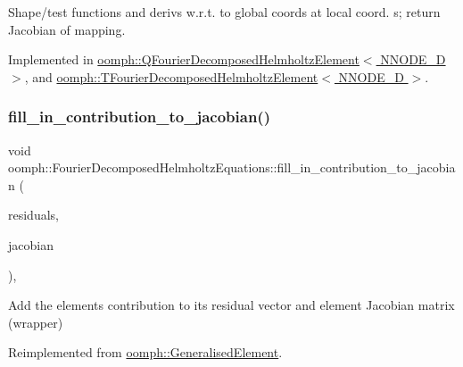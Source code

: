 Shape/test functions and derivs w.\+r.\+t. to global coords at local coord. s; return Jacobian of mapping. 



Implemented in \hyperlink{classoomph_1_1QFourierDecomposedHelmholtzElement_aa1d0a5bb5a90ffa76df0bb054ffb00db}{oomph\+::\+Q\+Fourier\+Decomposed\+Helmholtz\+Element$<$ N\+N\+O\+D\+E\+\_\+D $>$}, and \hyperlink{classoomph_1_1TFourierDecomposedHelmholtzElement_ae54e119a74f455c251ede7d536a7c0ab}{oomph\+::\+T\+Fourier\+Decomposed\+Helmholtz\+Element$<$ N\+N\+O\+D\+E\+\_\+D $>$}.

\mbox{\label{classoomph_1_1FourierDecomposedHelmholtzEquations_a75285db2b555ba4ad1f79ed9bb3bcf03}} 
\subsubsection{\texorpdfstring{fill\+\_\+in\+\_\+contribution\+\_\+to\+\_\+jacobian()}{fill\_in\_contribution\_to\_jacobian()}}
{\footnotesize\ttfamily void oomph\+::\+Fourier\+Decomposed\+Helmholtz\+Equations\+::fill\+\_\+in\+\_\+contribution\+\_\+to\+\_\+jacobian (\begin{DoxyParamCaption}\item[{\hyperlink{classoomph_1_1Vector}{Vector}$<$ double $>$ \&}]{residuals,  }\item[{\hyperlink{classoomph_1_1DenseMatrix}{Dense\+Matrix}$<$ double $>$ \&}]{jacobian }\end{DoxyParamCaption})\hspace{0.3cm}{\ttfamily [inline]}, {\ttfamily [virtual]}}



Add the element\textquotesingle{}s contribution to its residual vector and element Jacobian matrix (wrapper) 



Reimplemented from \hyperlink{classoomph_1_1GeneralisedElement_a6ae09fc0d68e4309ac1b03583d252845}{oomph\+::\+Generalised\+Element}.



